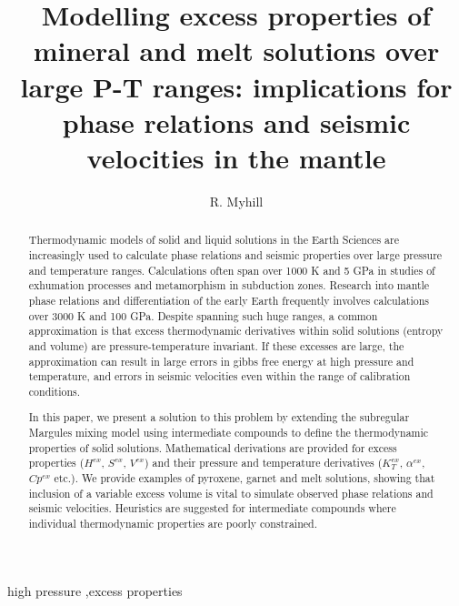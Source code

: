 \documentclass[review]{elsarticle}
\begin{document}
\begin{frontmatter}

\title{Modelling excess properties of mineral and melt solutions over large P-T ranges: implications for phase relations and seismic velocities in the mantle}

\author{R. Myhill}
\address{Bayerisches Geoinstitut, Universit\"{a}t Bayreuth, Universit\"{a}tsstrasse 30, 95447 Bayreuth, Germany}

\begin{abstract}
  Thermodynamic models of solid and liquid solutions in the Earth Sciences are increasingly used to calculate phase relations and seismic properties over large pressure and temperature ranges. Calculations often span over 1000 K and 5 GPa in studies of exhumation processes and metamorphism in subduction zones. Research into mantle phase relations and differentiation of the early Earth frequently involves calculations over 3000 K and 100 GPa. Despite spanning such huge ranges, a common approximation is that excess thermodynamic derivatives within solid solutions (entropy and volume) are pressure-temperature invariant. If these excesses are large, the approximation can result in large errors in gibbs free energy at high pressure and temperature, and errors in seismic velocities even within the range of calibration conditions. 

  In this paper, we present a solution to this problem by extending the subregular Margules mixing model using intermediate compounds to define the thermodynamic properties of solid solutions. Mathematical derivations are provided for excess properties ($H^{ex}$, $S^{ex}$, $V^{ex}$) and their pressure and temperature derivatives ($K_T^{ex}$, $\alpha^{ex}$, $Cp^{ex}$ etc.). We provide examples of pyroxene, garnet and melt solutions, showing that inclusion of a variable excess volume is vital to simulate observed phase relations and seismic velocities. Heuristics are suggested for intermediate compounds where individual thermodynamic properties are poorly constrained.


\end{abstract}

\begin{keyword}
high pressure \sep excess properties
\end{keyword}

\end{frontmatter}
\end{document}
